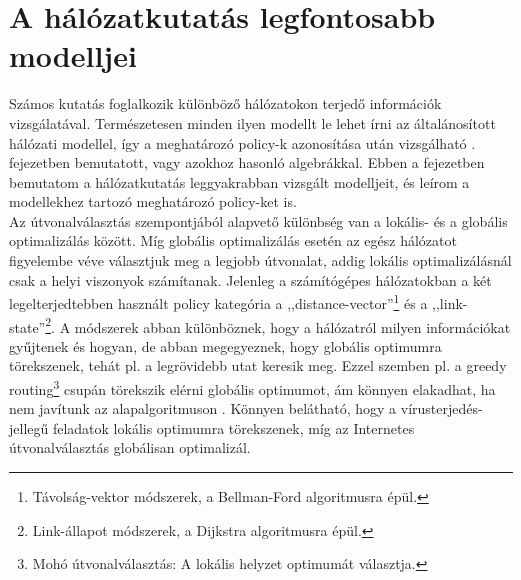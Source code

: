 
\chapter{A hálózatkutatás legfontosabb modelljei}\label{sect:chapter_examples}
\setcounter{note}{0}

Számos kutatás foglalkozik különböző hálózatokon terjedő információk vizsgálatával. Természetesen minden ilyen modellt le lehet írni az általánosított hálózati modellel, így a meghatározó policy-k azonosítása után vizsgálható . fejezetben bemutatott, vagy azokhoz hasonló algebrákkal. Ebben a fejezetben bemutatom a hálózatkutatás leggyakrabban vizsgált modelljeit, és leírom a modellekhez tartozó meghatározó policy-ket is.\\

Az útvonalválasztás szempontjából alapvető különbség van a lokális- és a globális optimalizálás között. Míg globális optimalizálás esetén az egész hálózatot figyelembe véve választjuk meg a legjobb útvonalat, addig lokális optimalizálásnál csak a helyi viszonyok számítanak. Jelenleg a számítógépes hálózatokban a két legelterjedtebben használt policy kategória a ,,distance-vector''\footnote{Távolság-vektor módszerek, a Bellman-Ford algoritmusra épül.} és a ,,link-state''\footnote{Link-állapot módszerek, a Dijkstra algoritmusra épül.}. A módszerek abban különböznek, hogy a hálózatról milyen információkat gyűjtenek és hogyan, de abban megegyeznek, hogy globális optimumra törekszenek, tehát pl. a legrövidebb utat keresik meg. Ezzel szemben pl. a greedy routing\footnote{Mohó útvonalválasztás: A lokális helyzet optimumát választja.} csupán törekszik elérni globális optimumot, ám könnyen elakadhat, ha nem javítunk az alapalgoritmuson \cite{Routing_with_Guaranteed_Delivery_in_Adhoc_Wireless_Networks}. Könnyen belátható, hogy a vírusterjedés-jellegű feladatok lokális optimumra törekszenek, míg az Internetes útvonalválasztás globálisan optimalizál.

